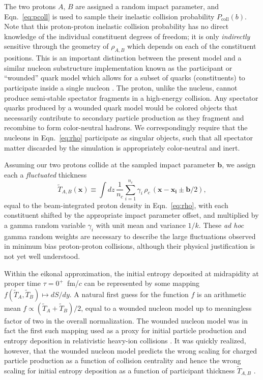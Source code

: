 \documentclass[aps,prc,reprint,amsmath,nofootinbib]{revtex4-1}
\newcommand{\T}{\tilde{T}}
\newcommand{\x}{\mathbf{x}}
\begin{document}
The two protons $A$, $B$ are assigned a random impact parameter, and Eqn.~\eqref{eq:pcoll} is used to sample their inelastic collision probability $P_\mathrm{coll}(b)$.
Note that this proton-proton inelastic collision probability has no direct knowledge of the individual constituent degrees of freedom; it is only \emph{indirectly} sensitive through the geometry of $\rho_{A, B}$ which depends on each of the constituent positions.
This is an important distinction between the present model and a similar nucleon substructure implementation known as the participant or ``wounded'' quark model which allows for a subset of quarks (constituents) to participate inside a single nucleon \cite{ANISOVICH1978477, Broniowski:2016pvx}.
The proton, unlike the nucleus, cannot produce semi-stable spectator fragments in a high-energy collision.
Any spectator quarks produced by a wounded quark model would be colored objects that necessarily contribute to secondary particle production as they fragment and recombine to form color-neutral hadrons.
We correspondingly require that the nucleons in Eqn.~\eqref{eq:rho} participate as singular objects, such that all spectator matter discarded by the simulation is appropriately color-neutral and inert.

Assuming our two protons collide at the sampled impact parameter $\mathbf{b}$, we assign each a \emph{fluctuated} thickness
\begin{equation}
  \label{eq:fluctuated_thick}
  \T_{A, B}(\x) \equiv \int dz\, \frac{1}{n_c} \sum\limits_{i=1}^{n_c} \gamma_i\, \rho_c \,(\mathbf{x} - \mathbf{x_i} \pm \mathbf{b}/2),
\end{equation}
equal to the beam-integrated proton density in Eqn.~\eqref{eq:rho}, with each constituent shifted by the appropriate impact parameter offset, and multiplied by a gamma random variable $\gamma_i$ with unit mean and variance $1/k$.
These \emph{ad hoc} gamma random weights are necessary to describe the large fluctuations observed in minimum bias proton-proton collisions, although their physical justification is not yet well understood.

Within the eikonal approximation, the initial entropy deposited at midrapidity at proper time $\tau=0^+$~fm/$c$ can be represented by some mapping ${f(\T_A, \T_B) \mapsto dS/dy}$.
A natural first guess for the function $f$ is an arithmetic mean $f \propto (\T_A + \T_B)/2$, equal to a wounded nucleon model up to meaningless factor of two in the overall normalization.
The wounded nucleon model was in fact the first such mapping used as a proxy for initial particle production and entropy deposition in relativistic heavy-ion collisions \cite{Bialas:1976ed}.
It was quickly realized, however, that the wounded nucleon model predicts the wrong scaling for charged particle production as a function of collision centrality and hence the wrong scaling for initial entropy deposition as a function of participant thickness $\T_{A,B}$ \cite{Kharzeev:2000ph}.
\end{document}
